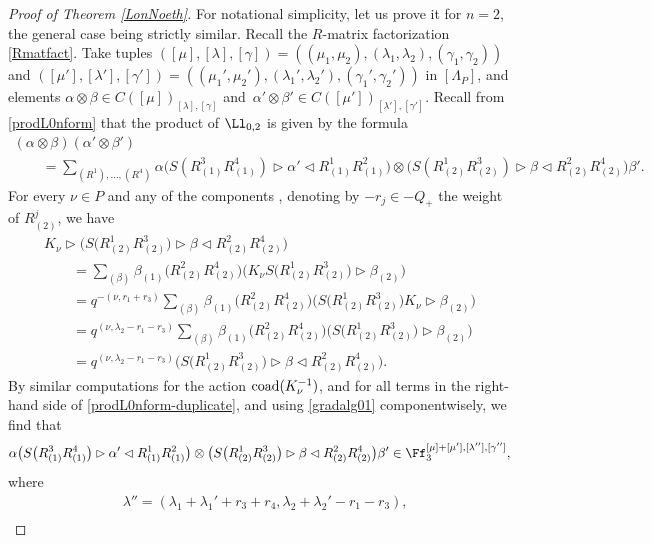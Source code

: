 \begin{proof}[Proof of Theorem \ref{LonNoeth}]
For notational simplicity, let us prove it for $n=2$, the general case being strictly similar. Recall the $R$-matrix factorization \eqref{Rmatfact}. Take tuples $([\mu],[\lambda],[\gamma]) =((\mu_1,\mu_2),(\lambda_1,\lambda_2),(\gamma_1,\gamma_2))$ and $([\mu'],[\lambda'],[\gamma'])=((\mu_1',\mu_2'),(\lambda_1',\lambda_2'),(\gamma_1',\gamma_2'))$ in $[\Lambda_P]$, and elements $\alpha\otimes \beta \in C([\mu])_{[\lambda],[\gamma]}$ and~${\alpha'\otimes \beta'\in C([\mu'])_{[\lambda'],[\gamma']}}$. Recall from \eqref{prodL0nform} that the product of $\Ll_{0,2}$ is given by the formula
\begin{gather}
(\alpha\otimes \beta) (\alpha' \otimes \beta') \nonumber\\
\qquad= \sum_{(R^1),\dots, (R^4)} \alpha \bigl(S(R^3_{(1)}R^4_{(1)})\rhd \alpha' \lhd R^1_{(1)}R^2_{(1)}\bigr)\otimes \bigl( S(R^1_{(2)}R^3_{(2)}) \rhd \beta \lhd R^2_{(2)}R^4_{(2)}\bigr)\beta'.\label{prodL0nform-duplicate}
\end{gather}
For every $\nu\in P$ and any of the components , denoting by $-r_j\in -Q_+$ the weight of $R^j_{(2)}$, we have
\begin{gather*}
K_\nu \rhd \big( S\big(R^1_{(2)}R^3_{(2)}\big) \rhd \beta \lhd R^2_{(2)}R^4_{(2)}\big) \\
 \qquad= \sum_{(\beta)} \beta_{(1)}\big(R^2_{(2)}R^4_{(2)}\big)\big(K_\nu S\big(R^1_{(2)}R^3_{(2)}\big)\rhd \beta_{(2)}\big)\\
 \qquad= q^{-(\nu,r_1+r_3)}\sum_{(\beta)} \beta_{(1)}\big(R^2_{(2)}R^4_{(2)}\big)\big(S\big(R^1_{(2)}R^3_{(2)}\big)K_\nu \rhd \beta_{(2)}\big)\\
 \qquad= q^{(\nu,\lambda_2-r_1-r_3)}\sum_{(\beta)} \beta_{(1)}\bigl(R^2_{(2)}R^4_{(2)}\bigr)\big(S\big(R^1_{(2)}R^3_{(2)}\big)\rhd \beta_{(2)}\big)\\
 \qquad= q^{(\nu,\lambda_2-r_1-r_3)} \big( S\big(R^1_{(2)}R^3_{(2)}\big) \rhd \beta \lhd R^2_{(2)}R^4_{(2)}\big).
\end{gather*}
By similar computations for the action ${\rm coad}(K_\nu^{-1})$, and for all terms in the right-hand side of \eqref{prodL0nform-duplicate}, and using \eqref{gradalg01} componentwisely, we find that
\[\alpha \big(S\big(R^3_{(1)}R^4_{(1)}\big)\rhd \alpha' \lhd R^1_{(1)}R^2_{(1)}\big)\otimes \big( S\big(R^1_{(2)}R^3_{(2)}\big) \rhd \beta \lhd R^2_{(2)}R^4_{(2)}\big)\beta' \in \Ff_3^{[\mu]+[\mu'], [\lambda''],[\gamma'']},\]
where
\begin{align*}
&\lambda'' = (\lambda_1+\lambda_1'+r_3+r_4,\lambda_2+\lambda_2'-r_1-r_3),\\

\end{align*}
\end{proof}
